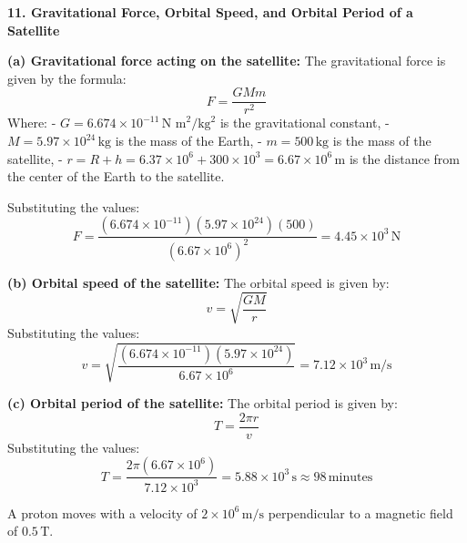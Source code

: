 \documentclass[addpoints]{exam}
\begin{document}
\begin{questions}
\begin{solution}[8cm]
\textbf{11. Gravitational Force, Orbital Speed, and Orbital Period of a Satellite}

\textbf{(a) Gravitational force acting on the satellite:}  
The gravitational force is given by the formula:
\[
F = \frac{G M m}{r^2}
\]
Where:
- \( G = 6.674 \times 10^{-11} \, \text{N m}^2 / \text{kg}^2 \) is the gravitational constant,
- \( M = 5.97 \times 10^{24} \, \text{kg} \) is the mass of the Earth,
- \( m = 500 \, \text{kg} \) is the mass of the satellite,
- \( r = R + h = 6.37 \times 10^6 + 300 \times 10^3 = 6.67 \times 10^6 \, \text{m} \) is the distance from the center of the Earth to the satellite.

Substituting the values:
\[
F = \frac{(6.674 \times 10^{-11}) (5.97 \times 10^{24}) (500)}{(6.67 \times 10^6)^2} = 4.45 \times 10^3 \, \text{N}
\]

\textbf{(b) Orbital speed of the satellite:}  
The orbital speed is given by:
\[
v = \sqrt{\frac{GM}{r}}
\]
Substituting the values:
\[
v = \sqrt{\frac{(6.674 \times 10^{-11}) (5.97 \times 10^{24})}{6.67 \times 10^6}} = 7.12 \times 10^3 \, \text{m/s}
\]

\textbf{(c) Orbital period of the satellite:}  
The orbital period is given by:
\[
T = \frac{2 \pi r}{v}
\]
Substituting the values:
\[
T = \frac{2 \pi (6.67 \times 10^6)}{7.12 \times 10^3} = 5.88 \times 10^3 \, \text{s} \approx 98 \, \text{minutes}
\]
\end{solution}



\question A proton moves with a velocity of \(2 \times 10^6 \, \text{m/s}\) perpendicular to a magnetic field of \(0.5 \, \text{T}\).
\end{questions}
\end{document}
